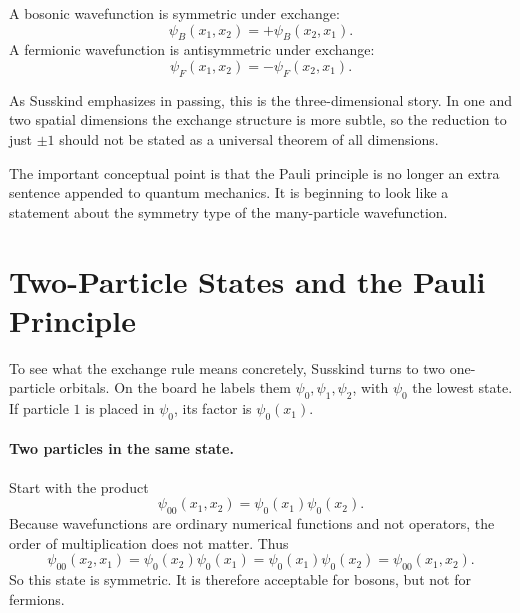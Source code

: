 \begin{definition}
A bosonic wavefunction is symmetric under exchange:
\begin{equation}
\psi_B(x_1,x_2)=+\psi_B(x_2,x_1).
\end{equation}
A fermionic wavefunction is antisymmetric under exchange:
\begin{equation}
\psi_F(x_1,x_2)=-\psi_F(x_2,x_1).
\end{equation}
\end{definition}

\begin{remark}
As Susskind emphasizes in passing, this is the three-dimensional story. In one and two spatial dimensions the exchange structure is more subtle, so the reduction to just \(\pm 1\) should not be stated as a universal theorem of all dimensions.
\end{remark}

The important conceptual point is that the Pauli principle is no longer an extra sentence appended to quantum mechanics. It is beginning to look like a statement about the symmetry type of the many-particle wavefunction.

\section{Two-Particle States and the Pauli Principle}

To see what the exchange rule means concretely, Susskind turns to two one-particle orbitals. On the board he labels them \(\psi_0,\psi_1,\psi_2\), with \(\psi_0\) the lowest state. If particle \(1\) is placed in \(\psi_0\), its factor is \(\psi_0(x_1)\).

\paragraph{Two particles in the same state.}

Start with the product
\begin{equation}
\psi_{00}(x_1,x_2)=\psi_0(x_1)\psi_0(x_2).
\end{equation}
Because wavefunctions are ordinary numerical functions and not operators, the order of multiplication does not matter. Thus
\begin{equation}
\psi_{00}(x_2,x_1)=\psi_0(x_2)\psi_0(x_1)=\psi_0(x_1)\psi_0(x_2)=\psi_{00}(x_1,x_2).
\end{equation}
So this state is symmetric. It is therefore acceptable for bosons, but not for fermions.

